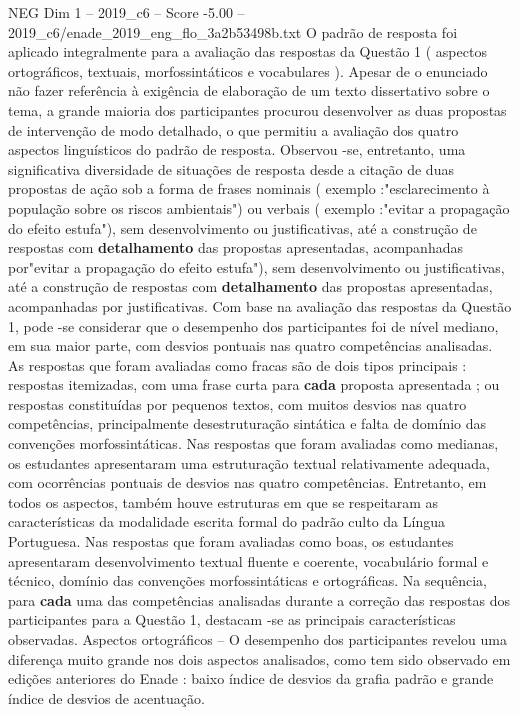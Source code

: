 \begin{textsample}{NEG Dim 1 – 2019\_c6 – Score -5.00 – 2019\_c6/enade\_2019\_eng\_flo\_3a2b53498b.txt}
O padrão de resposta foi aplicado integralmente para a avaliação das respostas da Questão 1 ( aspectos ortográficos, textuais, morfossintáticos e vocabulares ).
Apesar de o enunciado não fazer referência à exigência de elaboração de um texto dissertativo sobre o tema, a grande maioria dos participantes procurou desenvolver as duas propostas de intervenção de modo detalhado, o que permitiu a avaliação dos quatro aspectos linguísticos do padrão de resposta.
Observou -se, entretanto, uma significativa diversidade de situações de resposta desde a citação de duas propostas de ação sob a forma de frases nominais ( exemplo :"esclarecimento à população sobre os riscos ambientais") ou verbais ( exemplo :"evitar a propagação do efeito estufa"), sem desenvolvimento ou justificativas, até a construção de respostas com \textbf{detalhamento} das propostas apresentadas, acompanhadas por"evitar a propagação do efeito estufa"), sem desenvolvimento ou justificativas, até a construção de respostas com \textbf{detalhamento} das propostas apresentadas, acompanhadas por justificativas.
Com base na avaliação das respostas da Questão 1, pode -se considerar que o desempenho dos participantes foi de nível mediano, em sua maior parte, com desvios pontuais nas quatro competências analisadas.
As respostas que foram avaliadas como fracas são de dois tipos principais : respostas itemizadas, com uma frase curta para \textbf{cada} proposta apresentada ; ou respostas constituídas por pequenos textos, com muitos desvios nas quatro competências, principalmente desestruturação sintática e falta de domínio das convenções morfossintáticas.
Nas respostas que foram avaliadas como medianas, os estudantes apresentaram uma estruturação textual relativamente adequada, com ocorrências pontuais de desvios nas quatro competências.
Entretanto, em todos os aspectos, também houve estruturas em que se respeitaram as características da modalidade escrita formal do padrão culto da Língua Portuguesa.
Nas respostas que foram avaliadas como boas, os estudantes apresentaram desenvolvimento textual fluente e coerente, vocabulário formal e técnico, domínio das convenções morfossintáticas e ortográficas.
Na sequência, para \textbf{cada} uma das competências analisadas durante a correção das respostas dos participantes para a Questão 1, destacam -se as principais características observadas.
Aspectos ortográficos – O desempenho dos participantes revelou uma diferença muito grande nos dois aspectos analisados, como tem sido observado em edições anteriores do Enade : baixo índice de desvios da grafia padrão e grande índice de desvios de acentuação.

\end{textsample}
